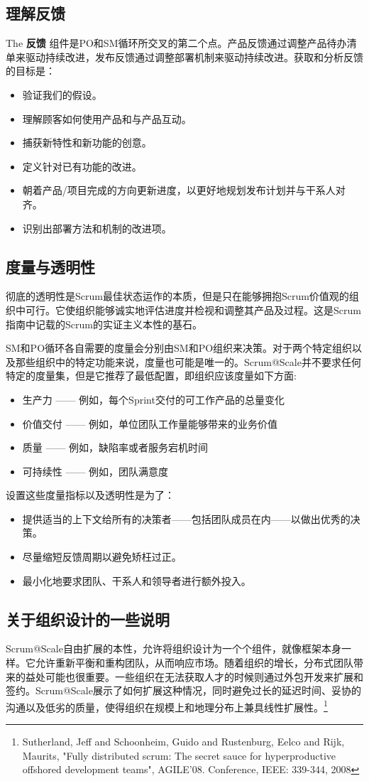 \documentclass[12pt,a4paper,parskip=full]{scrartcl}
\begin{document}
\begin{CJK*}{UTF8}{gbsn}
\subsection{理解反馈}
The \textbf{反馈} 组件是PO和SM循环所交叉的第二个点。产品反馈通过调整产品待办清单来驱动持续改进，发布反馈通过调整部署机制来驱动持续改进。获取和分析反馈的目标是：
\begin{itemize}
\item 验证我们的假设。
\item 理解顾客如何使用产品和与产品互动。
\item 捕获新特性和新功能的创意。
\item 定义针对已有功能的改进。
\item 朝着产品/项目完成的方向更新进度，以更好地规划发布计划并与干系人对齐。
\item 识别出部署方法和机制的改进项。
\end{itemize}

\subsection{度量与透明性}
彻底的透明性是Scrum最佳状态运作的本质，但是只在能够拥抱Scrum价值观的组织中可行。它使组织能够诚实地评估进度并检视和调整其产品及过程。这是Scrum指南中记载的Scrum的实证主义本性的基石。

SM和PO循环各自需要的度量会分别由SM和PO组织来决策。对于两个特定组织以及那些组织中的特定功能来说，度量也可能是唯一的。Scrum@Scale并不要求任何特定的度量集，但是它推荐了最低配置，即组织应该度量如下方面:
\begin{itemize}
\item 生产力 —— 例如，每个Sprint交付的可工作产品的总量变化
\item 价值交付 —— 例如，单位团队工作量能够带来的业务价值
\item 质量 —— 例如，缺陷率或者服务宕机时间
\item 可持续性 —— 例如，团队满意度
\end{itemize}
设置这些度量指标以及透明性是为了：
\begin{itemize}
  \item 提供适当的上下文给所有的决策者——包括团队成员在内——以做出优秀的决策。
\item 尽量缩短反馈周期以避免矫枉过正。
\item 最小化地要求团队、干系人和领导者进行额外投入。
 \end{itemize}
 
 \subsection{关于组织设计的一些说明}
Scrum@Scale自由扩展的本性，允许将组织设计为一个个组件，就像框架本身一样。它允许重新平衡和重构团队，从而响应市场。随着组织的增长，分布式团队带来的益处可能也很重要。一些组织在无法获取人才的时候则通过外包开发来扩展和签约。Scrum@Scale展示了如何扩展这种情况，同时避免过长的延迟时间、妥协的沟通以及低劣的质量，使得组织在规模上和地理分布上兼具线性扩展性。\footnote{Sutherland, Jeff and Schoonheim,
Guido and Rustenburg, Eelco and Rijk, Maurits, "Fully distributed scrum:
The secret sauce for hyperproductive offshored development teams",
AGILE'08. Conference, IEEE: 339-344, 2008}


\end{CJK*}
\end{document}
